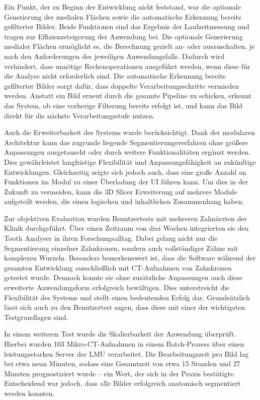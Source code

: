Ein Punkt, der zu Beginn der Entwicklung nicht feststand, war die optionale
Generierung der medialen Flächen sowie die automatische Erkennung bereits
gefilterter Bilder. Beide Funktionen sind das Ergebnis der Laufzeitmessung und tragen
zur Effizienzsteigerung der Anwendung bei. Die optionale Generierung medialer
Flächen ermöglicht es, die Berechnung gezielt an- oder auszuschalten, je nach den
Anforderungen des jeweiligen Anwendungsfalls. Dadurch wird verhindert, dass unnötige
Rechenoperationen ausgeführt werden, wenn diese für die Analyse nicht
erforderlich sind. Die automatische Erkennung bereits gefilterter Bilder sorgt dafür,
dass doppelte Verarbeitungsschritte vermieden werden. Anstatt ein Bild erneut durch
die gesamte Pipeline zu schicken, erkennt das System, ob eine vorherige Filterung
bereits erfolgt ist, und kann das Bild direkt für die nächste Verarbeitungsstufe
nutzen.

Auch die Erweiterbarkeit des Systems wurde berücksichtigt. Dank der modularen Architektur
kann das zugrunde liegende Segmentierungsverfahren ohne größere Anpassungen ausgetauscht
oder durch weitere Funktionalitäten ergänzt werden. Dies gewährleistet
langfristige Flexibilität und Anpassungsfähigkeit an zukünftige Entwicklungen. Gleichzeitig
zeigte sich jedoch auch, dass eine große Anzahl an Funktionen im Modul zu einer
Überladung der \ac{UI} führen kann. Um dies in der Zukunft zu vermeiden, kann die
3D Slicer Erweiterung auf mehrere Module aufgeteilt werden, die einen logischen
und inhaltlichen Zusammenhang haben.

Zur objektiven Evaluation wurden Benutzertests mit mehreren Zahnärzten der
Klinik durchgeführt. Über einen Zeitraum von drei Wochen integrierten sie den Tooth
Analyser in ihren Forschungsalltag. Dabei gelang nicht nur die Segmentierung
einzelner Zahnkronen, sondern auch vollständiger Zähne mit komplexen Wurzeln.
Besonders bemerkenswert ist, dass die Software während der gesamten Entwicklung ausschließlich
mit \ac{CT}-Aufnahmen von Zahnkronen getestet wurde. Dennoch konnte sie ohne
zusätzliche Anpassungen auch diese erweiterte Anwendungsform erfolgreich
bewältigen. Dies unterstreicht die Flexibilität des Systems und stellt einen bedeutenden
Erfolg dar. Grundsätzlich lässt sich auch zu den Benutzertest sagen, dass diese mit
einer der wichtigsten Testgrundlagen sind.

In einem weiteren Test wurde die Skalierbarkeit der Anwendung überprüft. Hierbei
wurden 103 Mikro-\ac{CT}-Aufnahmen in einem Batch-Prozess über einen leistungsstarken
Server der LMU verarbeitet. Die Bearbeitungszeit pro Bild lag bei etwa neun Minuten,
sodass eine Gesamtzeit von etwa 15 Stunden und 27 Minuten prognostiziert wurde –
ein Wert, der sich in der Praxis bestätigte. Entscheidend war jedoch, dass alle Bilder
erfolgreich anatomisch segmentiert werden konnten.


